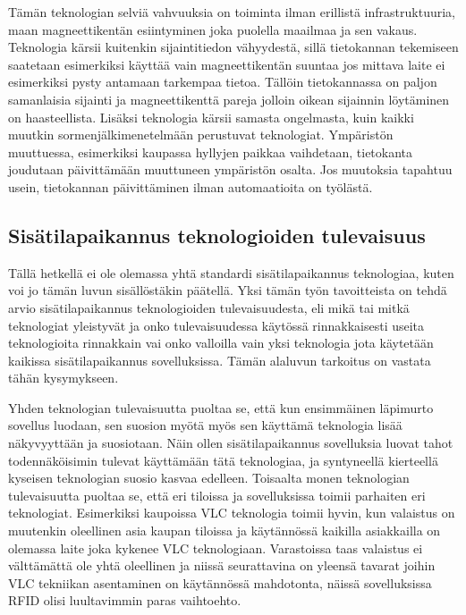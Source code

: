Tämän teknologian selviä vahvuuksia on toiminta ilman erillistä infrastruktuuria, maan magneettikentän esiintyminen joka puolella maailmaa ja sen vakaus\cite{magneetti}. Teknologia kärsii kuitenkin sijaintitiedon vähyydestä, sillä tietokannan tekemiseen saatetaan esimerkiksi käyttää vain magneettikentän suuntaa jos mittava laite ei esimerkiksi pysty antamaan tarkempaa tietoa\cite{magneetti}. Tällöin tietokannassa on paljon samanlaisia sijainti ja magneettikenttä pareja jolloin oikean sijainnin löytäminen on haasteellista. Lisäksi teknologia kärsii samasta ongelmasta, kuin kaikki muutkin sormenjälkimenetelmään perustuvat teknologiat. Ympäristön muuttuessa, esimerkiksi kaupassa hyllyjen paikkaa vaihdetaan, tietokanta joudutaan päivittämään muuttuneen ympäristön osalta. Jos muutoksia tapahtuu usein, tietokannan päivittäminen ilman automaatioita on työlästä.

\subsection{Sisätilapaikannus teknologioiden tulevaisuus}
Tällä hetkellä ei ole olemassa yhtä standardi sisätilapaikannus teknologiaa, kuten voi jo tämän luvun sisällöstäkin päätellä. Yksi tämän työn tavoitteista on tehdä arvio sisätilapaikannus teknologioiden tulevaisuudesta, eli mikä tai mitkä teknologiat yleistyvät ja onko tulevaisuudessa käytössä rinnakkaisesti useita teknologioita rinnakkain vai onko valloilla vain yksi teknologia jota käytetään kaikissa sisätilapaikannus sovelluksissa. Tämän alaluvun tarkoitus on vastata tähän kysymykseen.

Yhden teknologian tulevaisuutta puoltaa se, että kun ensimmäinen läpimurto sovellus luodaan, sen suosion myötä myös sen käyttämä teknologia lisää näkyvyyttään ja suosiotaan. Näin ollen sisätilapaikannus sovelluksia luovat tahot todennäköisimin tulevat käyttämään tätä teknologiaa, ja syntyneellä kierteellä kyseisen teknologian suosio kasvaa edelleen. Toisaalta monen teknologian tulevaisuutta puoltaa se, että eri tiloissa ja sovelluksissa toimii parhaiten eri teknologiat. Esimerkiksi kaupoissa VLC teknologia toimii hyvin, kun valaistus on muutenkin oleellinen asia kaupan tiloissa ja käytännössä kaikilla asiakkailla on olemassa laite joka kykenee VLC teknologiaan. Varastoissa taas valaistus ei välttämättä ole yhtä oleellinen ja niissä seurattavina on yleensä tavarat joihin VLC tekniikan asentaminen on käytännössä mahdotonta, näissä sovelluksissa RFID olisi luultavimmin paras vaihtoehto.

